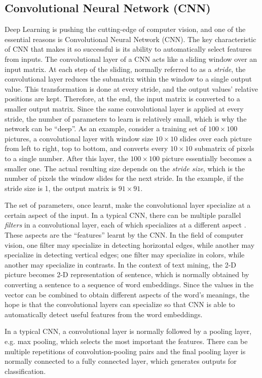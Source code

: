 \subsection{Convolutional Neural Network (CNN)}

Deep Learning is pushing the cutting-edge of computer vision, and one of the essential reasons is Convolutional Neural Network (CNN). The key characteristic of CNN that makes it so successful is its ability to automatically select features from inputs. The convolutional layer of a CNN acts like a sliding window over an input matrix. At each step of the sliding, normally referred to as a {\em stride}, the convolutional layer reduces the submatrix within the window to a single output value. This transformation is done at every stride, and the output values' relative positions are kept. Therefore, at the end, the input matrix is converted to a smaller output matrix. Since the same convolutional layer is applied at every stride, the number of parameters to learn is relatively small, which is why the network can be ``deep''. As an example, consider a training set of $100 \times 100$ pictures, a convolutional layer with window size $10 \times 10$ slides over each picture from left to right, top to bottom, and converts every $10 \times 10$ submatrix of pixels to a single number. After this layer, the $100 \times 100$ picture essentially becomes a smaller one. The actual resulting size depends on the {\em stride size}, which is the number of pixels the window slides for the next stride. In the example, if the stride size is 1, the output matrix is $91 \times 91$.

The set of parameters, once learnt, make the convolutional layer specialize at a certain aspect of the input. In a typical CNN, there can be multiple parallel {\em filters} in a convolutional layer, each of which specializes at a different aspect \cite{krizhevsky2012}. These aspects are the ``features'' learnt by the CNN. In the field of computer vision, one filter may specialize in detecting horizontal edges, while another may specialize in detecting vertical edges; one filter may specialize in colors, while another may specialize in contrasts. In the context of text mining, the 2-D picture becomes 2-D representation of sentence, which is normally obtained by converting a sentence to a sequence of word embeddings. Since the values in the vector can be combined to obtain different aspects of the word's meanings, the hope is that the convolutional layers can specialize so that CNN is able to automatically detect useful features from the word embeddings. 

In a typical CNN, a convolutional layer is normally followed by a pooling layer, e.g. max pooling, which selects the most important the features. There can be multiple repetitions of convolution-pooling pairs and the final pooling layer is normally connected to a fully connected layer, which generates outputs for classification. 
